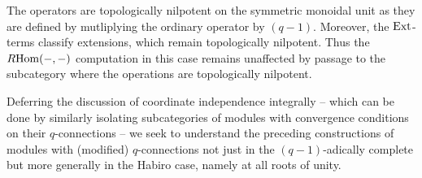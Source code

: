 \begin{remark}
    The operators are topologically nilpotent on the symmetric monoidal unit as they are defined by mutliplying the ordinary operator by $(q-1)$. Moreover, the $\mathrm{Ext}$-terms classify extensions, which remain topologically nilpotent. Thus the $R\mathrm{Hom}(-,-)$ computation in this case remains unaffected by passage to the subcategory where the operations are topologically nilpotent. 
\end{remark}
Deferring the discussion of coordinate independence integrally -- which can be done by similarly isolating subcategories of modules with convergence conditions on their $q$-connections -- we seek to understand the preceding constructions of modules with (modified) $q$-connections not just in the $(q-1)$-adically complete but more generally in the Habiro case, namely at all roots of unity. 

